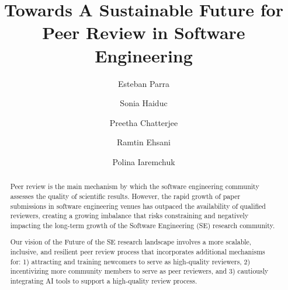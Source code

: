 \documentclass[sigconf]{acmart}
\begin{document}
\title{Towards A Sustainable Future for Peer Review in Software Engineering}



\author{Esteban Parra}

\author{Sonia Haiduc}

\author{Preetha Chatterjee}

\author{Ramtin Ehsani}

\author{Polina Iaremchuk}

\renewcommand{\shortauthors}{Trovato et al.}

\begin{abstract}
  Peer review is the main mechanism by which the software engineering community assesses the quality of scientific results. However, the rapid growth of paper submissions in software engineering venues has outpaced the availability of qualified reviewers, creating a growing imbalance that risks constraining and negatively impacting the long-term growth of the Software Engineering (SE) research community. 
  
  Our vision of the Future of the SE research landscape involves a more scalable, inclusive, and resilient peer review process that incorporates additional mechanisms for: 1) attracting and training newcomers to serve as high-quality reviewers, 2) incentivizing more community members to serve as peer reviewers, and 3) cautiously integrating AI tools to support a high-quality review process.
\end{abstract}
\end{document}
